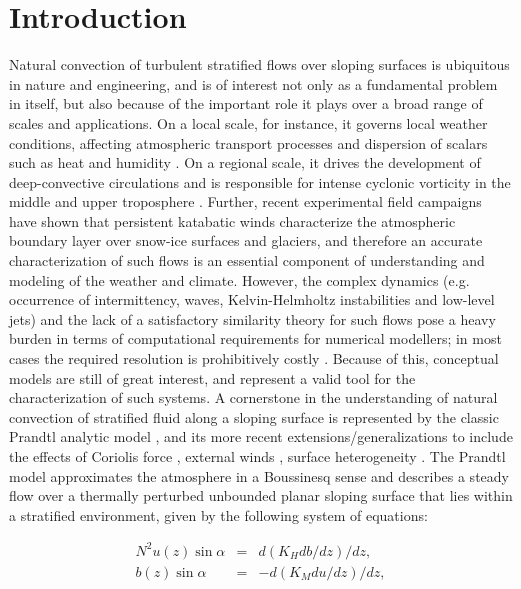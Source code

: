 \section{Introduction}
Natural convection of turbulent stratified flows over sloping surfaces is ubiquitous in nature and engineering, and is of interest not only as a fundamental problem in itself, but also because of the important role it plays over a broad range of scales and applications. 
On a local scale, for instance, it governs local weather conditions, affecting atmospheric transport processes and dispersion of scalars such as heat and humidity \citep{Monti2002, Nylen2004b}. 
On a regional scale, it drives the development of deep-convective circulations \citep{Egger1985, Parish1998} and is responsible for intense cyclonic vorticity in the middle and upper troposphere \citep{Parish1992}.
Further, recent experimental field campaigns \citep{Chu1987, Oerlemans1993} have shown that persistent katabatic winds characterize the atmospheric boundary layer over snow-ice surfaces and glaciers, and therefore an accurate characterization of such flows is an essential component of understanding and modeling of the weather and climate.
However, the complex dynamics (e.g. occurrence of intermittency, waves, Kelvin-Helmholtz instabilities and low-level jets) and the lack of a satisfactory similarity theory for such flows \citep{Nadeau2012} pose a heavy burden in terms of computational requirements for numerical modellers; in most cases the required resolution is prohibitively costly \citep{Shapiro2004, Shapiro2004a, Fedorovich2009, Fedorovich2009d, Burkholder2011a}.
Because of this, conceptual models are still of great interest, and represent a valid tool for the characterization of such systems. 
A cornerstone in the understanding of natural convection of stratified fluid along a sloping surface is represented by the classic Prandtl analytic model \citep{Prandtl}, and its more recent extensions/generalizations to include the effects of Coriolis force \citep{Gutman1964}, external winds \citep{Lykosov_1972}, surface heterogeneity \citep{Egger1985, Shapiro2007, Oldroyd2014}.
The Prandtl model approximates the atmosphere in a Boussinesq sense and describes a steady flow over a thermally perturbed unbounded planar sloping surface that lies within a stratified environment, given by the following system of equations:
%
\begin{linenomath*}
\begin{eqnarray}
	N^2 u(z) \sin{\alpha} & = & d( K_H db/dz )/dz,
	\label{eqn1u} \\
	b(z) \sin{\alpha} & = & -d( K_M du/dz )/dz,
	\label{eqn1b}
\end{eqnarray}
\end{linenomath*}

